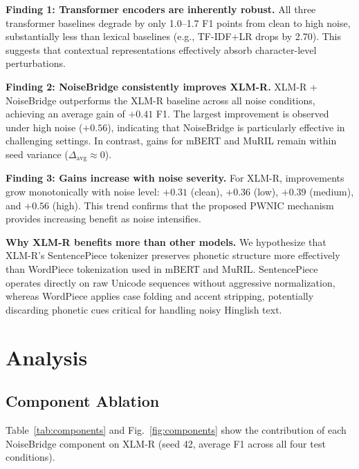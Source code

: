 \documentclass[conference]{IEEEtran}
\begin{document}
\vspace{-0.3em}

\textbf{Finding 1: Transformer encoders are inherently robust.}
All three transformer baselines degrade by only 1.0--1.7 F1 points from clean to high noise, substantially less than lexical baselines (e.g., TF-IDF+LR drops by 2.70). This suggests that contextual representations effectively absorb character-level perturbations.

\textbf{Finding 2: NoiseBridge consistently improves XLM-R.}
XLM-R + NoiseBridge outperforms the XLM-R baseline across all noise conditions, achieving an average gain of $+0.41$ F1. The largest improvement is observed under high noise ($+0.56$), indicating that NoiseBridge is particularly effective in challenging settings. In contrast, gains for mBERT and MuRIL remain within seed variance ($\Delta_{\text{avg}} \approx 0$).

\textbf{Finding 3: Gains increase with noise severity.}
For XLM-R, improvements grow monotonically with noise level: $+0.31$ (clean), $+0.36$ (low), $+0.39$ (medium), and $+0.56$ (high). This trend confirms that the proposed PWNIC mechanism provides increasing benefit as noise intensifies.

\textbf{Why XLM-R benefits more than other models.}
We hypothesize that XLM-R's SentencePiece tokenizer preserves phonetic structure more effectively than WordPiece tokenization used in mBERT and MuRIL. SentencePiece operates directly on raw Unicode sequences without aggressive normalization, whereas WordPiece applies case folding and accent stripping, potentially discarding phonetic cues critical for handling noisy Hinglish text.

\section{Analysis}
\label{sec:analysis}

\subsection{Component Ablation}

Table~\ref{tab:components} and Fig.~\ref{fig:components} show the contribution of each NoiseBridge component on XLM-R (seed 42, average F1 across all four test conditions).
\end{document}
